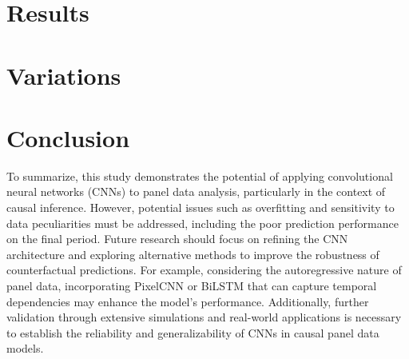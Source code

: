 \documentclass[12pt]{article}
\begin{document}
\section{Results}


\section{Variations}


\section{Conclusion}

To summarize, this study demonstrates the potential of applying convolutional neural networks (CNNs) to panel data analysis, particularly in the context of causal inference.
However, potential issues such as overfitting and sensitivity to data peculiarities must be addressed, including
the poor prediction performance on the final period.
Future research should focus on refining the CNN architecture and exploring alternative methods to improve the robustness of counterfactual predictions.
For example, considering the autoregressive nature of panel data, incorporating PixelCNN or BiLSTM that 
can capture temporal dependencies may enhance the model's performance.
Additionally, further validation through extensive simulations and real-world applications is necessary to establish the reliability and generalizability of CNNs in causal panel data models.

\newpage
\printbibliography
\end{document}
